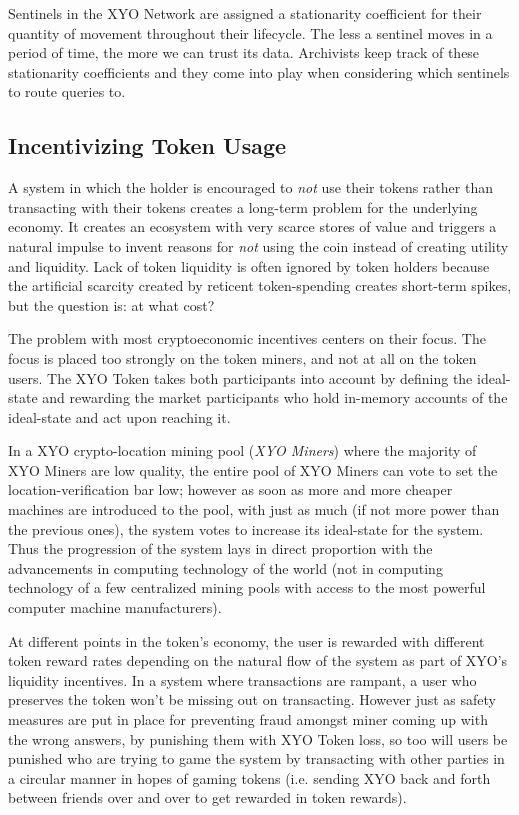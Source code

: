 \documentclass{article}
\begin{document}
Sentinels in the XYO Network are assigned a stationarity coefficient for their quantity of movement throughout their lifecycle. The less a sentinel moves in a period of time, the more we can trust its data. Archivists keep track of these stationarity coefficients and they come into play when considering which sentinels to route queries to.

\subsection{Incentivizing Token Usage}
A system in which the holder is encouraged to \textit{not} use their tokens rather than transacting with their tokens creates a long-term problem for the underlying economy.  It creates an ecosystem with very scarce stores of value and triggers a natural impulse to invent reasons for \textit{not} using the coin instead of creating utility and liquidity. Lack of token liquidity is often ignored by token holders because the artificial scarcity created by reticent token-spending creates short-term spikes, but the question is: at what cost?

The problem with most cryptoeconomic incentives centers on their focus. The focus is placed too strongly on the token miners, and not at all on the token users. The XYO Token takes both participants into account by defining the ideal-state and rewarding the market participants who hold in-memory accounts of the ideal-state and act upon reaching it.

In a XYO crypto-location mining pool (\textit{XYO Miners})  where the majority of XYO Miners are low quality, the entire pool of XYO Miners can vote to set the location-verification bar low; however as soon as more and more cheaper machines are introduced to the pool, with just as much (if not more power than the previous ones), the system votes to increase its ideal-state for the system. Thus the progression of the system lays in direct proportion with the advancements in computing technology of the world (not in computing technology of a few centralized mining pools with access to the most powerful computer machine manufacturers).

At different points in the token's economy, the user is rewarded with different token reward rates depending on the natural flow of the system as part of XYO's liquidity incentives. In a system where transactions are rampant, a user who preserves the token won't be missing out on transacting. However just as safety measures are put in place for preventing fraud amongst miner coming up with the wrong answers, by punishing them with XYO Token loss, so too will users be punished who are trying to game the system by transacting with other parties in a circular manner in hopes of gaming tokens (i.e. sending XYO back and forth between friends over and over to get rewarded in token rewards).
\end{document}
